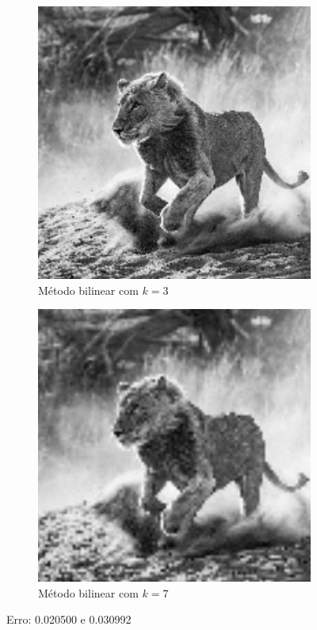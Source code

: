\documentclass[leqno]{article}
\begin{document}
\begin{itemize}
        \begin{figure}[H]
          \centering
          \begin{subfigure}{.45\textwidth}
            \centering
            \includegraphics[width=.7\linewidth]{../images/leaopb_k3.png}
            \caption{Método bilinear com $k = 3$}
            \label{fig:sub2}
          \end{subfigure}
          \begin{subfigure}{.45\textwidth}
              \centering
              \includegraphics[width=.7\linewidth]{../images/leaopb_k7.png}
              \caption{Método bilinear com $k = 7$}
              \label{fig:sub1}
            \end{subfigure}%
          \caption{Erro: 0.020500 e 0.030992}
          \label{fig:test}
      \end{figure}


\end{itemize}
\end{document}
